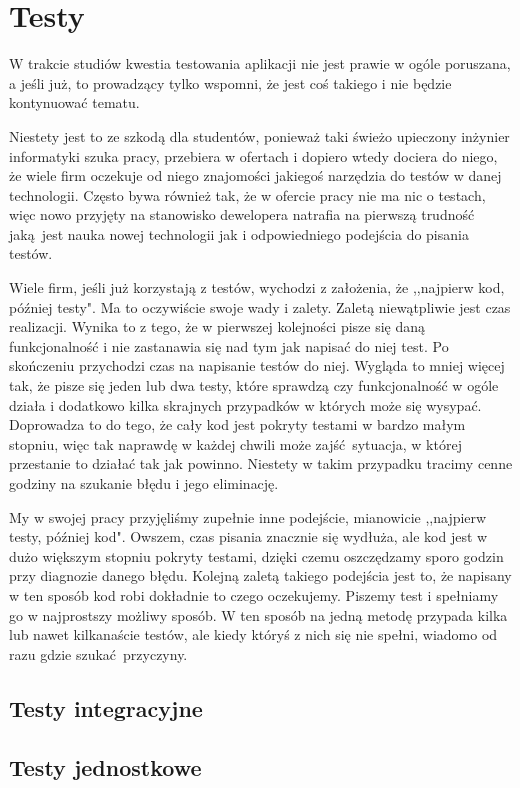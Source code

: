 \section{Testy}
	\label{testy}
	W trakcie studiów kwestia testowania aplikacji nie jest prawie w ogóle poruszana, a jeśli już, to prowadzący tylko wspomni, że jest coś takiego i nie będzie kontynuować tematu.

	Niestety jest to ze szkodą dla studentów, ponieważ taki świeżo upieczony inżynier informatyki szuka pracy, przebiera w ofertach i dopiero wtedy dociera do niego, że wiele firm oczekuje od niego znajomości jakiegoś narzędzia do testów w danej technologii. Często bywa również tak, że w ofercie pracy nie ma nic o testach, więc nowo przyjęty na stanowisko dewelopera natrafia na pierwszą trudność jaką jest nauka nowej technologii jak i odpowiedniego podejścia do pisania testów.

	Wiele firm, jeśli już korzystają z testów, wychodzi z założenia, że ,,najpierw kod, później testy". Ma to oczywiście swoje wady i zalety. Zaletą niewątpliwie jest czas realizacji. Wynika to z tego, że w pierwszej kolejności pisze się daną funkcjonalność i nie zastanawia się nad tym jak napisać do niej test. Po skończeniu przychodzi czas na napisanie testów do niej. Wygląda to mniej więcej tak, że pisze się jeden lub dwa testy, które sprawdzą czy funkcjonalność w ogóle działa i dodatkowo kilka skrajnych przypadków w których może się wysypać. Doprowadza to do tego, że cały kod jest pokryty testami w bardzo małym stopniu, więc tak naprawdę w każdej chwili może zajść sytuacja, w której przestanie to działać tak jak powinno. Niestety w takim przypadku tracimy cenne godziny na szukanie błędu i jego eliminację.

	My w swojej pracy przyjęliśmy zupełnie inne podejście, mianowicie ,,najpierw testy, później kod". Owszem, czas pisania znacznie się wydłuża, ale kod jest w dużo większym stopniu pokryty testami, dzięki czemu oszczędzamy sporo godzin przy diagnozie danego błędu. Kolejną zaletą takiego podejścia jest to, że napisany w ten sposób kod robi dokładnie to czego oczekujemy. Piszemy test i spełniamy go w najprostszy możliwy sposób. W ten sposób na jedną metodę przypada kilka lub nawet kilkanaście testów, ale kiedy któryś z nich się nie spełni, wiadomo od razu gdzie szukać przyczyny.

	\newpage

  \subsection{Testy integracyjne}
  \subsection{Testy jednostkowe}
